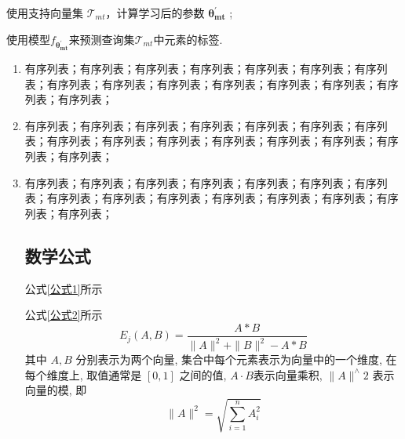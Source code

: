 \documentclass{template.cls} %
\begin{document}
\begin{multicols}{2}
\begin{algorithm}[H]
	
	
	使用支持向量集 $\mathcal{T}_{mt}$，计算学习后的参数 $\bm{{\theta}^{\prime}_{mt}}$ ; 
	
	使用模型$f_{\bm{{\theta}_{mt}^{\prime}}}$来预测查询集$\mathcal{T}_{mt}$中元素的标签.

\end{algorithm}
\vspace{0.5em}

    \begin{enumerate}
        \item 有序列表；有序列表；有序列表；有序列表；有序列表；有序列表；有序列表；有序列表；有序列表；有序列表；有序列表；有序列表；有序列表；有序列表；有序列表；
        \item 有序列表；有序列表；有序列表；有序列表；有序列表；有序列表；有序列表；有序列表；有序列表；有序列表；有序列表；有序列表；有序列表；有序列表；有序列表；
        \item 有序列表；有序列表；有序列表；有序列表；有序列表；有序列表；有序列表；有序列表；有序列表；有序列表；有序列表；有序列表；有序列表；有序列表；有序列表；

\subsection{数学公式}
公式\eqref{公式1}所示

公式\eqref{公式2}所示
\begin{equation}
\label{公式1}
    E_j(A, B)=\frac{A * B}{\|A\|^2+\|B\|^2-A * B}
\end{equation}
其中 $A, B$ 分别表示为两个向量, 集合中每个元素表示为向量中的一个维度, 在每个维度上, 取值通常是 $[0,1]$ 之间的值, $A\cdot B$表示向量乘积, $\|A\|^{\wedge} 2$ 表示向量的模, 即
\begin{equation}
\label{公式2}
    \|A\|^2=\sqrt{\sum_{i=1}^n A_i^2}
\end{equation}

    \end{enumerate}



\end{multicols}
\end{document}
